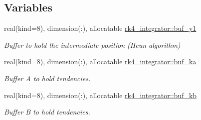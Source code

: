 \subsection*{Variables}
\begin{DoxyCompactItemize}
\item 
real(kind=8), dimension(\+:), allocatable \hyperlink{namespacerk4__integrator_a43998877d687c6b6c99050930aa50287}{rk4\+\_\+integrator\+::buf\+\_\+y1}
\begin{DoxyCompactList}\small\item\em Buffer to hold the intermediate position (Heun algorithm) \end{DoxyCompactList}\item 
real(kind=8), dimension(\+:), allocatable \hyperlink{namespacerk4__integrator_add2986973e491454b6af98e9a44b12d7}{rk4\+\_\+integrator\+::buf\+\_\+ka}
\begin{DoxyCompactList}\small\item\em Buffer A to hold tendencies. \end{DoxyCompactList}\item 
real(kind=8), dimension(\+:), allocatable \hyperlink{namespacerk4__integrator_a5e96789cc7477207582c4115459307c3}{rk4\+\_\+integrator\+::buf\+\_\+kb}
\begin{DoxyCompactList}\small\item\em Buffer B to hold tendencies. \end{DoxyCompactList}\end{DoxyCompactItemize}
